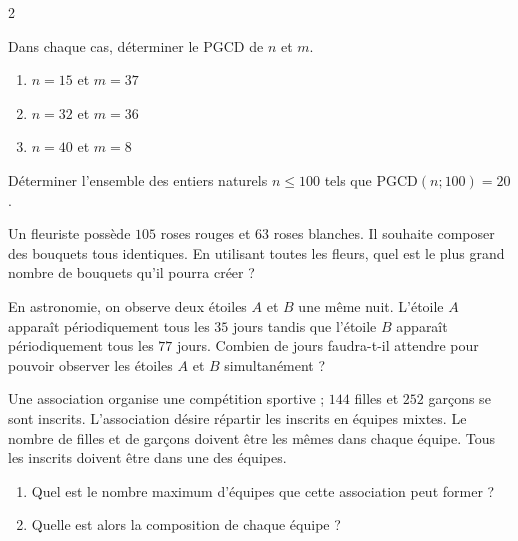 \documentclass[a4paper,12pt]{article}
\title{
\centering
\tcbset{colframe=BlackSav,colback=GrayBG}
\tcbox[tikznode]{
Chapitre 5 \\ PGCD et applications
}
}
\author{}
\date{}
\begin{document}
\maketitle

\begin{multicols}{2}
\begin{exercice}[title=Exercice 1 $\quad \star \quad$ { [Calculer] }]{}{}
Dans chaque cas, déterminer le PGCD de $n$ et $m$.
\begin{enumerate}
    \item $n = 15$ et $m = 37$
    \item $n = 32$ et $m = 36$
    \item $n = 40$ et $m = 8$
\end{enumerate}
\end{exercice}

\begin{exercice}[title=Exercice 2 $\quad \star \quad$ { [Calculer] }]{}{}
Déterminer l’ensemble des entiers naturels $n \leq 100$ tels que $\text{PGCD}(n; 100) = 20$.
\end{exercice}

\begin{exercice}[title=Exercice 3 $\quad \star \quad$ { [Modéliser, Calculer] }]{}{}
Un fleuriste possède $105$ roses rouges et $63$ roses blanches. Il souhaite composer des bouquets tous identiques.  
En utilisant toutes les fleurs, quel est le plus grand nombre de bouquets qu’il pourra créer ?
\end{exercice}

\begin{exercice}[title=Exercice 4 $\quad \star \quad$ { [Modéliser, Calculer] }]{}{}
En astronomie, on observe deux étoiles $A$ et $B$ une même nuit. L’étoile $A$ apparaît périodiquement tous les $35$ jours tandis que l’étoile $B$ apparaît périodiquement tous les $77$ jours.  
Combien de jours faudra-t-il attendre pour pouvoir observer les étoiles $A$ et $B$ simultanément ?
\end{exercice}

\begin{exercice}[title=Exercice 5 $\quad \star \quad$ { [Modéliser, Calculer] }]{}{}
Une association organise une compétition sportive ; $144$ filles et $252$ garçons se sont inscrits. L’association désire répartir les inscrits en équipes mixtes. Le nombre de filles et de garçons doivent être les mêmes dans chaque équipe. Tous les inscrits doivent être dans une des équipes.  
\begin{enumerate}
    \item Quel est le nombre maximum d’équipes que cette association peut former ?
    \item Quelle est alors la composition de chaque équipe ?
\end{enumerate}
\end{exercice}


\end{multicols}
\end{document}
